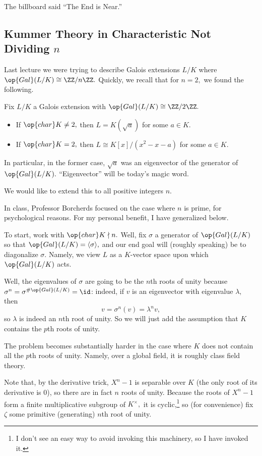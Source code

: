 \documentclass[../notes.tex]{subfiles}
\begin{document}














The billboard said ``The End is Near.''

\subsection{Kummer Theory in Characteristic Not Dividing \texorpdfstring{$n$}{n}}
Last lecture we were trying to describe Galois extensions $L/K$ where $\op{Gal}(L/K)\cong\ZZ/n\ZZ.$ Quickly, we recall that for $n=2,$ we found the following.
\begin{proposition}
	Fix $L/K$ a Galois extension with $\op{Gal}(L/K)\cong\ZZ/2\ZZ.$
	\begin{itemize}
		\item If $\op{char}K\ne2,$ then $L=K(\sqrt a)$ for some $a\in K.$
		\item If $\op{char}K=2,$ then $L\cong K[x]/\left(x^2-x-a\right)$ for some $a\in K.$
	\end{itemize}
\end{proposition}
\begin{remark}
	In particular, in the former case, $\sqrt a$ was an eigenvector of the generator of $\op{Gal}(L/K).$ ``Eigenvector'' will be today's magic word.
\end{remark}
We would like to extend this to all positive integers $n.$
\begin{warn}
	In class, Professor Borcherds focused on the case where $n$ is prime, for psychological reasons. For my personal benefit, I have generalized below.
\end{warn}
To start, work with $\op{char}K\nmid n.$ Well, fix $\sigma$ a generator of $\op{Gal}(L/K)$ so that $\op{Gal}(L/K)=\langle\sigma\rangle,$ and our end goal will (roughly speaking) be to diagonalize $\sigma.$ Namely, we view $L$ as a $K$-vector space upon which $\op{Gal}(L/K)$ acts.

Well, the eigenvalues of $\sigma$ are going to be the $n$th roots of unity because $\sigma^n=\sigma^{\#\op{Gal}(L/K)}=\id$: indeed, if $v$ is an eigenvector with eigenvalue $\lambda,$ then
\[v=\sigma^n(v)=\lambda^nv,\]
so $\lambda$ is indeed an $n$th root of unity. So we will just add the assumption that $K$ contains the $p$th roots of unity.
\begin{warn}
	The problem becomes substantially harder in the case where $K$ does not contain all the $p$th roots of unity. Namely, over a global field, it is roughly class field theory.
\end{warn}
Note that, by the derivative trick, $X^n-1$ is separable over $K$ (the only root of its derivative is $0$), so there are in fact $n$ roots of unity. Because the roots of $X^n-1$ form a finite multiplicative subgroup of $K^\times,$ it is cyclic,\footnote{I don't see an easy way to avoid invoking this machinery, so I have invoked it.} so (for convenience) fix $\zeta$ some primitive (generating) $n$th root of unity.
\end{document}
